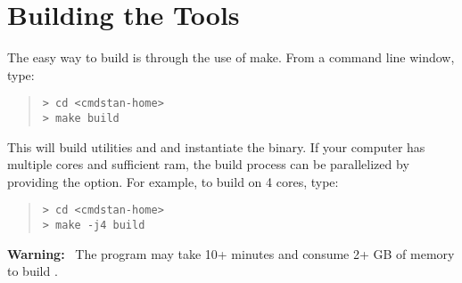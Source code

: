 %





\section{Building the \CmdStan Tools}\label{build.section}

The easy way to build \CmdStan is through the use of make. From a
command line window, type:
%
\begin{quote}
\begin{Verbatim}[fontshape=sl,fontsize=\small]
> cd <cmdstan-home>
> make build
\end{Verbatim}
\end{quote}
%
This will build utilities  and  and instantiate the  binary.
If your computer has multiple cores and sufficient ram, the build process can be parallelized
by providing the  option. For example, to build on 4 cores, type:
%
\begin{quote}
\begin{Verbatim}[fontshape=sl,fontsize=\small]
> cd <cmdstan-home>
> make -j4 build
\end{Verbatim}
\end{quote}
%
\textbf{Warning:} \ The  program may take 10+ minutes and
consume 2+ GB of memory to build \CmdStan.
